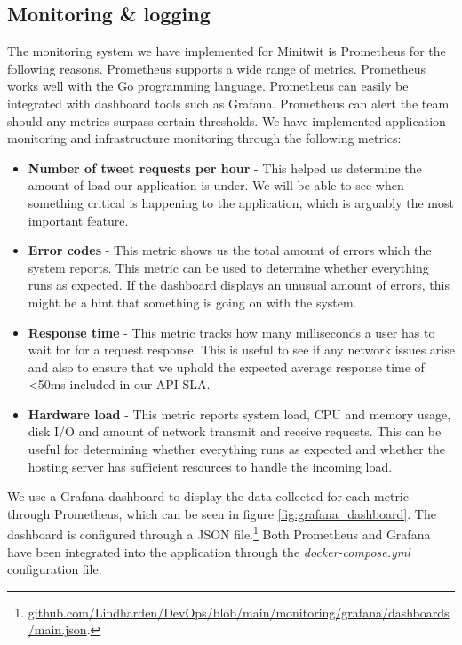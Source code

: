 \subsection{Monitoring \& logging}
The monitoring system we have implemented for Minitwit is Prometheus for the following reasons. Prometheus supports a wide range of metrics. Prometheus works well with the Go programming language. Prometheus can easily be integrated with dashboard tools such as Grafana. Prometheus can alert the team should any metrics surpass certain thresholds. We have implemented application monitoring and infrastructure monitoring through the following metrics:
\begin{itemize}
    \item \textbf{Number of tweet requests per hour} - This helped us determine the amount of load our application is under. We will be able to see when something critical is happening to the application, which is arguably the most important feature.
    \item \textbf{Error codes} - This metric shows us the total amount of errors which the system reports. This metric can be used to determine whether everything runs as expected. If the dashboard displays an unusual amount of errors, this might be a hint that something is going on with the system.
    \item \textbf{Response time} - This metric tracks how many milliseconds a user has to wait for for a request response. This is useful to see if any network issues arise and also to ensure that we uphold the expected average response time of <50ms included in our API SLA.
    \item \textbf{Hardware load} - This metric reports system load, CPU and memory usage, disk I/O and amount of network transmit and receive requests. This can be useful for determining whether everything runs as expected and whether the hosting server has sufficient resources to handle the incoming load.
\end{itemize}
We use a Grafana dashboard to display the data collected for each metric through Prometheus, which can be seen in figure \ref{fig:grafana_dashboard}. The dashboard is configured through a JSON file.\footnote{\href{https://github.com/Lindharden/DevOps/blob/main/monitoring/grafana/dashboards/main.json}{github.com/Lindharden/DevOps/blob/main/monitoring/grafana/dashboards/main.json}.} Both Prometheus and Grafana have been integrated into the application through the \textit{docker-compose.yml} configuration file.

